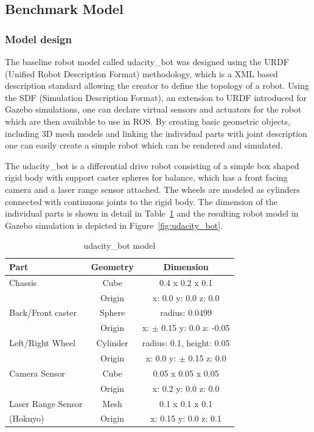\documentclass[10pt,journal,compsoc]{IEEEtran}
\begin{document}
\subsection{Benchmark Model}
\subsubsection{Model design}

The baseline robot model called udacity\_bot was designed using the URDF (Unified Robot Description Format) methodology, which is a XML based description standard allowing the creator to define the topology of a robot. 
Using the SDF (Simulation Description Format), an extension to URDF introduced for Gazebo simulations, one can declare virtual sensors and actuators for the robot which are then available to use in ROS.
By creating basic geometric objects, including 3D mesh models and linking the individual parts with joint description one can easily create a simple robot which can be rendered and simulated.


The udacity\_bot is a differential drive robot consisting of a simple box shaped rigid body with support caster spheres for balance, which has a front facing camera and a laser range sensor attached. The wheels are modeled as cylinders connected with continuous joints to the rigid body.
The dimension of the individual parts is shown in detail in Table~\ref{tab:udacity_bot_model} and the resulting robot model in Gazebo simulation is depicted in Figure~\ref{fig:udacity_bot}.

\begin{table}[h]
      \caption{udacity\_bot model}
      \label{tab:udacity_bot_model}
      \begin{center}
            \begin{tabular}{|l||c|c|} 
                  \hline
                  Part & Geometry & Dimension\\ \hline \hline
                  Chassis & Cube & 0.4 x 0.2 x 0.1 \\ 
                  & Origin & x: 0.0 y: 0.0 z: 0.0 \\ \hline 
                  Back/Front caster & Sphere & radius: 0.0499 \\ 
                  & Origin & x: $\pm$ 0.15 y: 0.0 z: -0.05 \\ \hline 
                  Left/Right Wheel & Cylinder & radius: 0.1, height: 0.05 \\ 
                  & Origin & x: 0.0 y: $\pm$ 0.15 z: 0.0 \\ \hline \hline  
                  Camera Sensor & Cube &  0.05 x 0.05 x 0.05\\ 
                  & Origin & x: 0.2 y: 0.0 z: 0.0 \\ \hline 
                  Laser Range Sensor & Mesh &  0.1 x 0.1 x 0.1\\ 
                  (Hokuyo)  & Origin & x: 0.15 y: 0.0 z: 0.1 \\ \hline         
            \end{tabular}
      \end{center}
\end{table}
 
\end{document}
